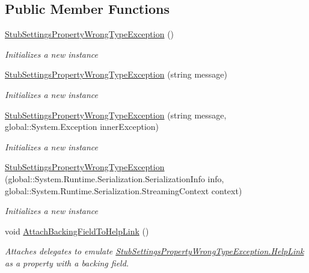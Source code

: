 \subsection*{Public Member Functions}
\begin{DoxyCompactItemize}
\item 
\hyperlink{class_system_1_1_configuration_1_1_fakes_1_1_stub_settings_property_wrong_type_exception_ad002361112e7a0f30251242f7b774684}{Stub\-Settings\-Property\-Wrong\-Type\-Exception} ()
\begin{DoxyCompactList}\small\item\em Initializes a new instance\end{DoxyCompactList}\item 
\hyperlink{class_system_1_1_configuration_1_1_fakes_1_1_stub_settings_property_wrong_type_exception_ad917b76a47e6a955bb7b3b996cebaed5}{Stub\-Settings\-Property\-Wrong\-Type\-Exception} (string message)
\begin{DoxyCompactList}\small\item\em Initializes a new instance\end{DoxyCompactList}\item 
\hyperlink{class_system_1_1_configuration_1_1_fakes_1_1_stub_settings_property_wrong_type_exception_ad2b42f6736e148d62ae741fca31ccd6c}{Stub\-Settings\-Property\-Wrong\-Type\-Exception} (string message, global\-::\-System.\-Exception inner\-Exception)
\begin{DoxyCompactList}\small\item\em Initializes a new instance\end{DoxyCompactList}\item 
\hyperlink{class_system_1_1_configuration_1_1_fakes_1_1_stub_settings_property_wrong_type_exception_a01e446c1e29ff419c59e22edf1c15f5e}{Stub\-Settings\-Property\-Wrong\-Type\-Exception} (global\-::\-System.\-Runtime.\-Serialization.\-Serialization\-Info info, global\-::\-System.\-Runtime.\-Serialization.\-Streaming\-Context context)
\begin{DoxyCompactList}\small\item\em Initializes a new instance\end{DoxyCompactList}\item 
void \hyperlink{class_system_1_1_configuration_1_1_fakes_1_1_stub_settings_property_wrong_type_exception_ac5652bee389e9a50ed667e72d9e1768c}{Attach\-Backing\-Field\-To\-Help\-Link} ()
\begin{DoxyCompactList}\small\item\em Attaches delegates to emulate \hyperlink{class_system_1_1_configuration_1_1_fakes_1_1_stub_settings_property_wrong_type_exception_a2eb66fcfa04624ccb172dd3a8207e79e}{Stub\-Settings\-Property\-Wrong\-Type\-Exception.\-Help\-Link} as a property with a backing field.\end{DoxyCompactList}\item 

\end{DoxyCompactItemize}
